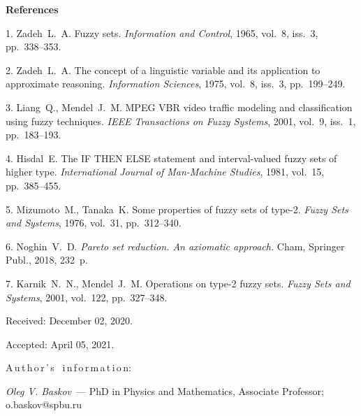 

{\small



\vskip6mm

\noindent \textbf{References} }

\vskip 2mm

{\footnotesize



1. Zadeh~L.~A. Fuzzy sets. {\it Information and Control}, 1965, vol.~8, iss.~3, pp.~338--353.

2. Zadeh~L.~A. The concept of a linguistic variable and its application to approximate reasoning. {\it Information Sciences}, 1975, vol.~8, iss.~3, pp.~199--249.

3. Liang~Q., Mendel~J.~M. MPEG VBR video traffic modeling and classification using fuzzy techniques. {\it IEEE Transactions on Fuzzy Systems}, 2001, vol.~9, iss.~1, pp.~183--193.

4. Hisdal~E. The IF THEN ELSE statement and interval-valued fuzzy sets of higher type. {\it International Journal of Man-Machine Studies}, 1981, vol.~15, pp.~385--455.

5. Mizumoto~M., Tanaka~K. Some properties of fuzzy sets of type-2. {\it Fuzzy Sets and Systems}, 1976, vol.~31, pp.~312--340.

6. Noghin~V.~D. {\it Pareto set reduction. An axiomatic approach.} Cham, Springer Publ., 2018, 232~p.

7. Karnik~N.~N., Mendel~J.~M. Operations on type-2 fuzzy sets. {\it Fuzzy Sets and Systems}, 2001, vol.~122, pp.~327--348.




\vskip 1.5mm

%


Received:  December 02, 2020.

Accepted: April 05, 2021.

\vskip 6mm A\,u\,t\,h\,o\,r\,'\,s \ i\,n\,f\,o\,r\,m\,a\,t\,i\,o\,n:

\vskip 2mm \textit{Oleg V. Baskov}~--- PhD in Physics and Mathematics, Associate Professor; %
o.baskov@spbu.ru


}
